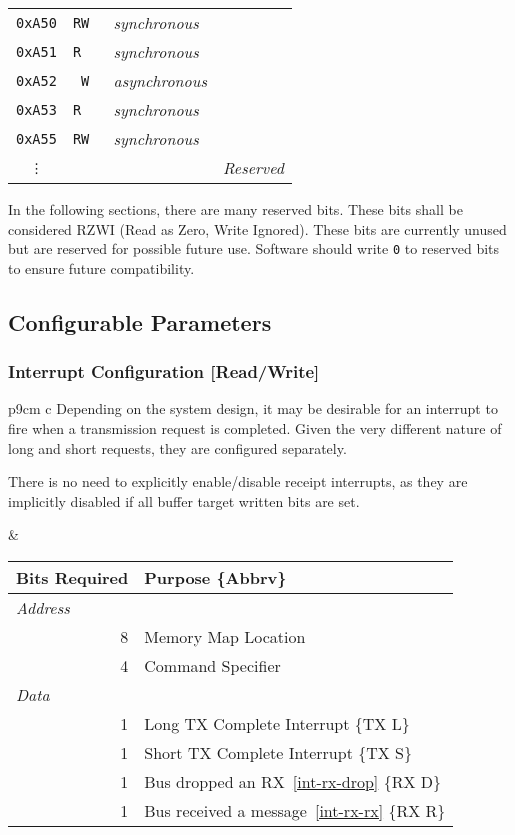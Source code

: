 \begin{tabular}{ c|c|l|l }
  {\tt 0xA50}  & \tt RW & {\em  synchronous} & \nameref{reg-conf} \\
  {\tt 0xA51}  & \tt R~ & {\em  synchronous} & \nameref{reg-int} \\
  {\tt 0xA52}  & \tt ~W & {\em asynchronous} & \nameref{reg-tx-multi} \\
  {\tt 0xA53}  & \tt R~ & {\em  synchronous} & \nameref{reg-tx-result} \\
  {\tt 0xA55}  & \tt RW & {\em  synchronous} & \nameref{reg-rx-multi} \\
  {\tt \vdots} & \tt ~~ &                    & \em Reserved \\
\end{tabular}

In the following sections, there are many reserved bits. These bits shall be
considered RZWI (Read as Zero, Write Ignored). These bits are currently
unused but are reserved for possible future use. Software should write {\tt 0}
to reserved bits to ensure future compatibility.

\subsection{Configurable Parameters}

\subsubsection{Interrupt Configuration [Read/Write]}
\label{reg-conf}
\begin{tabular}{p{9cm} c}
\vspace{-5em}
Depending on the system design, it may be desirable for an interrupt to fire
when a transmission request is completed. Given the very different nature of
long and short requests, they are configured separately.

There is no need to explicitly enable/disable receipt interrupts, as they are
implicitly disabled if all buffer target written bits are set.

&

\begin{tabular}{r l}
  Bits Required & Purpose \{Abbrv\} \\
  \hline
  \hline
  \multicolumn{1}{l}{\em Address} & \\
  8 & \bus Memory Map Location \\
  4 & Command Specifier \\
  \multicolumn{1}{l}{\em Data} & \\
  1 & Long TX Complete Interrupt \{TX L\} \\
  1 & Short TX Complete Interrupt \{TX S\} \\
  1 & Bus dropped an RX~\ref{int-rx-drop} \{RX D\} \\
  1 & Bus received a message~\ref{int-rx-rx} \{RX R\} \\
\end{tabular}

\\

\end{tabular}

